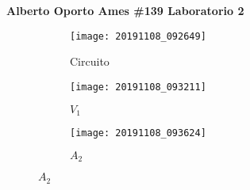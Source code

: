 \documentclass{article}
\begin{document}
\textbf{Alberto Oporto Ames \#139 Laboratorio 2}
\thispagestyle{fancy}

\begin{figure}[h]
	\begin{subfigure}{0.48\textwidth}
		\centering
		\texttt{[image: 20191108\_092649]}
		\caption{Circuito}%
		\label{fig:circuito}
	\end{subfigure}
	\begin{subfigure}{0.48\textwidth}
		\centering
		\texttt{[image: 20191108\_093211]}
		\caption{$V_1$}%
		\label{fig:v1}
	\end{subfigure}

	\vspace{0.5cm}
	\centering
	\begin{subfigure}{0.48\textwidth}
		\centering
		\texttt{[image: 20191108\_093624]}
		\caption{$A_2$}%
		\label{fig:a2}
	\end{subfigure}
\end{figure}
\end{document}

